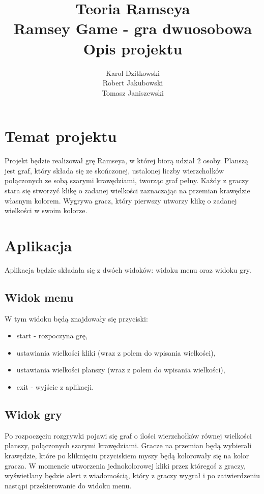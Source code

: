 \documentclass[11pt,a4paper]{article}
\author{
	Karol Dzitkowski\\
	Robert Jakubowski\\
	Tomasz Janiszewski
}
\title{
	Teoria Ramseya\\
	\huge{Ramsey Game - gra dwuosobowa}\\
	Opis projektu
 }
\begin{document}
\maketitle
\newpage

\tableofcontents
\newpage

\section{Temat projektu}
Projekt będzie realizował grę Ramseya, w której biorą udział 2 osoby.
Planszą jest graf, który składa się ze skończonej, ustalonej liczby wierzchołków połączonych ze sobą szarymi
krawędziami, tworząc graf pełny. Każdy z graczy stara się stworzyć klikę o zadanej wielkości zaznaczając
na przemian krawędzie własnym kolorem. Wygrywa gracz, który pierwszy utworzy klikę o zadanej wielkości w swoim kolorze.

\section{Aplikacja}
Aplikacja będzie składała się z dwóch widoków: widoku menu oraz widoku gry.

\subsection{Widok menu}
W tym widoku będą znajdowały się przyciski:

\begin{itemize}
	\item start - rozpoczyna grę,
	\item ustawiania wielkości kliki (wraz z polem do wpisania wielkości),
	\item ustawiania wielkości planszy (wraz z polem do wpisania wielkości),
	\item exit - wyjście z aplikacji.
\end{itemize}

\subsection{Widok gry}
Po rozpoczęciu rozgrywki pojawi się graf o ilości wierzchołków równej wielkości planszy, połączonych szarymi krawędziami.
Gracze na przemian będą wybierali krawędzie, które po kliknięciu przyciskiem myszy będą kolorowały
się na kolor gracza. W momencie utworzenia jednokolorowej kliki przez któregoś z graczy, wyświetlany
będzie alert z wiadomością, który z graczy wygrał i po zatwierdzeniu nastąpi przekierowanie do widoku menu.
\end{document}
